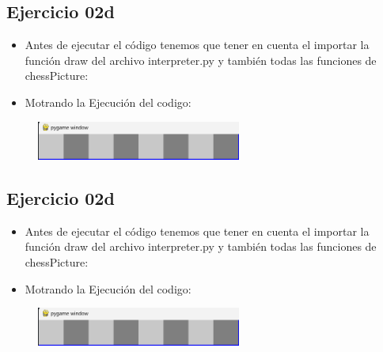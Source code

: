 \documentclass{article}
\begin{document}
	\subsection{Ejercicio 02d}
	\begin{itemize}	
		\item Antes de ejecutar el código tenemos que tener en cuenta el importar la función draw del archivo interpreter.py y también todas las funciones de chessPicture:
	\end{itemize}	
	
		

	\begin{itemize}	
		\item Motrando la Ejecución del codigo:
	\end{itemize}	
	
	\begin{figure}[H]
		\centering
		\includegraphics[width=0.6\textwidth,keepaspectratio]{img/Ejercicio2d.png}
	\end{figure}

	\subsection{Ejercicio 02d}
	\begin{itemize}	
		\item Antes de ejecutar el código tenemos que tener en cuenta el importar la función draw del archivo interpreter.py y también todas las funciones de chessPicture:
	\end{itemize}	
	
		

	\begin{itemize}	
		\item Motrando la Ejecución del codigo:
	\end{itemize}	
	
	\begin{figure}[H]
		\centering
		\includegraphics[width=0.6\textwidth,keepaspectratio]{img/Ejercicio2d.png}
	\end{figure}
\end{document}
